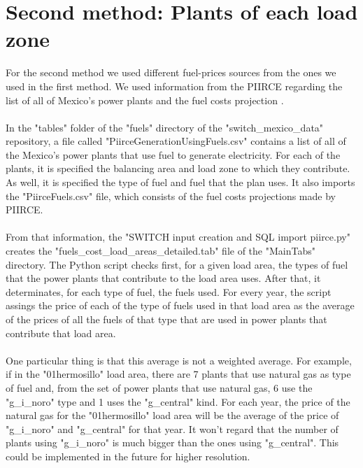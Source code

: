 \documentclass{article}
\begin{document}
\section{Second method: Plants of each load zone}
For the second method we used different fuel-prices sources from the ones we used in the first method. We used information from the PIIRCE regarding the list of all of Mexico's power plants\cite{piirceg} and the fuel costs projection \cite{piircef}.
\\
\\In the "tables" folder of the "fuels" directory of the "switch\_mexico\_data" repository, a file called "PiirceGenerationUsingFuels.csv" contains a list of all of the Mexico's power plants that use fuel to generate electricity. For each of the plants, it is specified the balancing area and load zone to which they contribute. As well, it is specified the type of fuel and fuel that the plan uses. It also imports the "PiirceFuels.csv" file, which consists of the fuel costs projections made by PIIRCE\cite{piircef}.
\\
\\From that information, the "SWITCH input creation and SQL import piirce.py" creates the "fuels\_cost\_load\_areas\_detailed.tab" file of the "MainTabs" directory. The Python script checks first, for a given load area, the types of fuel that the power plants that contribute to the load area uses. After that, it determinates, for each type of fuel, the fuels used. For every year, the script assings the price of each of the type of fuels used in that load area as the average of the prices of all the fuels of that type that are used in power plants that contribute that load area. 
\\
\\One particular thing is that this average is not a weighted average. For example, if in the "01\-hermosillo" load area, there are 7 plants that use natural gas as type of fuel and, from the set of power plants that use natural gas, 6 use the "g\_i\_noro" type and 1 uses the "g\_central"  kind. For each year, the price of the natural gas for the "01\-hermosillo" load area will be the average of the price of "g\_i\_noro" and "g\_central" for that year. It won't regard that the number of plants using "g\_i\_noro" is much bigger than the ones using "g\_central". This could be implemented in the future for higher resolution.
\end{document}
